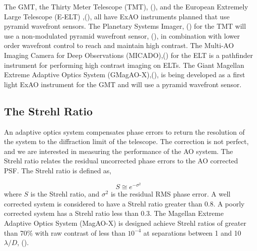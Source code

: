 The GMT, the Thirty Meter Telescope (TMT), (\cite{chisholm2020thirty}), and the European Extremely Large Telescope (E-ELT) ,(\cite{ramsay2020eso}), all have ExAO instruments planned that use pyramid wavefront sensors. The Planetary Systems Imager,  (\cite{fitzgerald2019planetary}) for the TMT will use a non-modulated pyramid wavefront sensor, (\cite{guyon2018wavefront}), in combination with lower order wavefront control to reach and maintain high contrast. The Multi-AO Imaging Camera for Deep Observations (MICADO),(\cite{davies2018micado}) for the ELT is a pathfinder instrument for performing high contrast imaging on ELTs. The Giant Magellan Extreme Adaptive Optics System (GMagAO-X),(\cite{males2019gmagao}), is being developed as a first light ExAO instrument for the GMT and will use a pyramid wavefront sensor. 









\subsection{The Strehl Ratio}

An adaptive optics system compensates phase errors to return the resolution of the system to the diffraction limit of the telescope. The correction is not perfect, and we are interested in measuring the performance of the AO system. The Strehl ratio relates the residual uncorrected phase errors to the AO corrected PSF. The Strehl ratio is defined as,

\begin{equation}
    S \cong e^{-\sigma^2}
\end{equation}
where $S$ is the Strehl ratio, and $\sigma^2$ is the residual RMS phase error. A well corrected system is considered to have a Strehl ratio greater than 0.8. A poorly corrected system has a Strehl ratio less than 0.3.  The Magellan Extreme Adaptive Optics System (MagAO-X) is designed achieve Strehl ratios of greater than 70$\%$ with raw contrast of less than $10^{-4}$ at separations between 1 and 10 $\lambda/D$, (\cite{males2018magao}).

